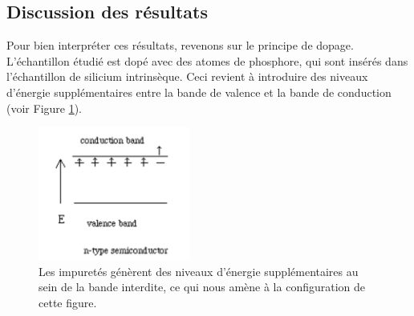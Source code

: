 \subsection{Discussion des résultats}
Pour bien interpréter ces résultats, revenons sur le principe de dopage. L'échantillon étudié
est dopé avec des atomes de phosphore, qui sont insérés dans l'échantillon de silicium intrinsèque. Ceci revient à introduire des niveaux d'énergie supplémentaires entre la bande de valence et la bande de conduction (voir Figure \ref{doping}).

\begin{figure}[ht]
  \begin{center}
		\includegraphics[width=5cm]{./images/doping.png}
		\caption{Les impuretés génèrent des niveaux d'énergie supplémentaires au sein de la bande interdite, ce qui nous amène à la configuration de cette figure.}
		\label{doping}
	\end{center}
\end{figure}

